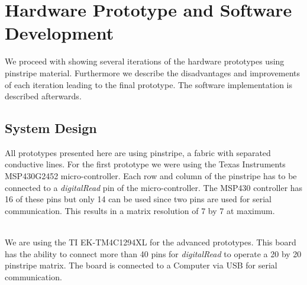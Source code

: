 %
\chapter{Hardware Prototype and Software Development}
\label{Hardware Prototype and Software Development} 
We proceed with showing several iterations of the hardware prototypes using pinstripe material. Furthermore we describe the disadvantages and improvements of each iteration leading to the final prototype. The software implementation is described afterwards.

\section{System Design}
All prototypes presented here are using pinstripe, a fabric with separated conductive lines. For the first prototype we were using the Texas Instruments MSP430G2452 micro-controller. Each row and column of the pinstripe has to be connected to a \emph{digitalRead} pin of the micro-controller. The MSP430 controller has 16 of these pins but only 14 can be used since two pins are used for serial communication. This results in a matrix resolution of 7 by 7 at maximum. 
\\ \\

We are using the TI EK-TM4C1294XL for the advanced prototypes. This board has the ability to connect more than 40 pins for \emph{digitalRead} to operate a 20 by 20 pinstripe matrix. The board is connected to a Computer via USB for serial communication.\\

